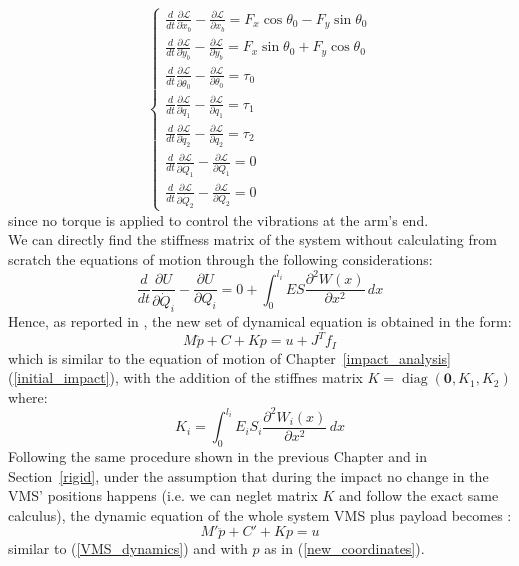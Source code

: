 \documentclass[a4paper,12pt,oneside]{report}
\begin{document}
\begin{equation}
  \begin{cases}
    \frac{d}{dt}\frac{\partial \mathcal{L} }{\partial \dot{x}_b}-\frac{\partial \mathcal{L} }{\partial x_b}=F_x\cos{\theta_0}-F_y\sin{\theta_0}\\
    \frac{d}{dt}\frac{\partial \mathcal{L} }{\partial \dot{y}_b}-\frac{\partial \mathcal{L} }{\partial y_b}=F_x\sin{\theta_0}+F_y\cos{\theta_0}\\
    \frac{d}{dt}\frac{\partial \mathcal{L} }{\partial \dot{\theta}_0}-\frac{\partial \mathcal{L} }{\partial \theta_0}=\tau_0\\
    \frac{d}{dt}\frac{\partial \mathcal{L} }{\partial \dot{q}_1}-\frac{\partial \mathcal{L} }{\partial q_1}=\tau_1\\
    \frac{d}{dt}\frac{\partial \mathcal{L} }{\partial \dot{q}_2}-\frac{\partial \mathcal{L} }{\partial q_2}=\tau_2\\
    \frac{d}{dt}\frac{\partial \mathcal{L} }{\partial \dot{Q}_1}-\frac{\partial \mathcal{L} }{\partial Q_1}=0\\
    \frac{d}{dt}\frac{\partial \mathcal{L} }{\partial \dot{Q}_2}-\frac{\partial \mathcal{L} }{\partial Q_2}=0
  \end{cases}
\end{equation}
since no torque is applied to control the vibrations at the arm's end.\\
We can directly find the stiffness matrix of the system without calculating from scratch the equations of motion through the following considerations:
\begin{equation}
  \frac{d}{dt}\frac{\partial U}{\partial \dot{Q}_i}-\frac{\partial U}{\partial Q_i}=0+\int_{0}^{l_i}ES\frac{\partial^2 W(x)}{\partial x^2}\,dx
\end{equation}
Hence, as reported in \cite{sixteen}, the new set of dynamical equation is obtained in the form:
\begin{equation}
  M\ddot{p}+C+Kp=u+J^Tf_I
\end{equation}
which is similar to the equation of motion of Chapter~\ref{impact_analysis} (\ref{initial_impact}), with the addition of the stiffnes matrix $K=\operatorname{diag}(\textbf{0},K_1,K_2)$ where:
\begin{equation}
  K_i=\int_{0}^{l_i}E_iS_i\frac{\partial^2 W_i(x)}{\partial x^2}\,dx
\end{equation}
Following the same procedure shown in the previous Chapter and in Section~\ref{rigid}, under the assumption that during the impact no change in the VMS' positions happens (i.e. we can neglet matrix $K$ and follow the exact same calculus), the dynamic equation of the whole system VMS plus payload becomes \cite{sixteen}:
\begin{equation}
  M'\ddot{p}+C'+Kp=u
\end{equation}
similar to (\ref{VMS_dynamics}) and with $p$ as in (\ref{new_coordinates}).
\newpage
\end{document}
